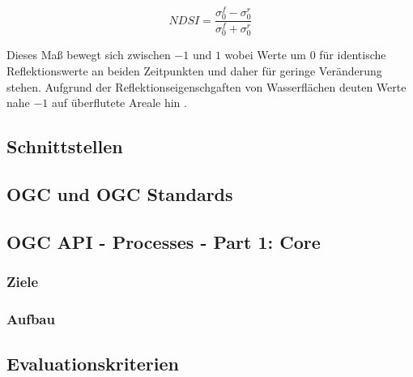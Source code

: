 \begin{equation}
    NDSI = \frac{\sigma_0^f-\sigma_0^r}{\sigma_0^f+\sigma_0^r}
\end{equation} 

Dieses Maß bewegt sich zwischen $-1$ und $1$ wobei 
Werte um $0$ für identische Reflektionswerte an beiden Zeitpunkten und daher für geringe Veränderung stehen. 
Aufgrund der Reflektionseigenschgaften von Wasserflächen deuten Werte nahe $-1$ auf überflutete Areale hin \cite{flood_proxy_mapping_ndsi}. 

\subsection{Schnittstellen}
\subsection{OGC und OGC Standards}
\subsection{OGC API - Processes - Part 1: Core}
\subsubsection{Ziele}
\subsubsection{Aufbau}
\subsection{Evaluationskriterien}



